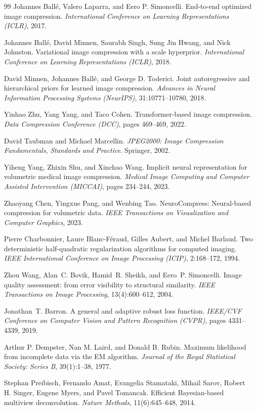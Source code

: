 \documentclass[11pt,a4paper]{article}
\begin{document}
\begin{thebibliography}{99}
Johannes Ball\'e, Valero Laparra, and Eero P. Simoncelli.
End-to-end optimized image compression.
\textit{International Conference on Learning Representations (ICLR)}, 2017.

Johannes Ball\'e, David Minnen, Saurabh Singh, Sung Jin Hwang, and Nick Johnston.
Variational image compression with a scale hyperprior.
\textit{International Conference on Learning Representations (ICLR)}, 2018.

David Minnen, Johannes Ball\'e, and George D. Toderici.
Joint autoregressive and hierarchical priors for learned image compression.
\textit{Advances in Neural Information Processing Systems (NeurIPS)}, 31:10771--10780, 2018.

Yinhao Zhu, Yang Yang, and Taco Cohen.
Transformer-based image compression.
\textit{Data Compression Conference (DCC)}, pages 469--469, 2022.

David Taubman and Michael Marcellin.
\textit{JPEG2000: Image Compression Fundamentals, Standards and Practice}.
Springer, 2002.

Yiheng Yang, Zhixin Shu, and Xinchao Wang.
Implicit neural representation for volumetric medical image compression.
\textit{Medical Image Computing and Computer Assisted Intervention (MICCAI)}, pages 234--244, 2023.

Zhaoyang Chen, Yingxue Pang, and Wenbing Tao.
NeuroCompress: Neural-based compression for volumetric data.
\textit{IEEE Transactions on Visualization and Computer Graphics}, 2023.

Pierre Charbonnier, Laure Blanc-F{\'e}raud, Gilles Aubert, and Michel Barlaud.
Two deterministic half-quadratic regularization algorithms for computed imaging.
\textit{IEEE International Conference on Image Processing (ICIP)}, 2:168--172, 1994.

Zhou Wang, Alan~C. Bovik, Hamid~R. Sheikh, and Eero~P. Simoncelli.
Image quality assessment: from error visibility to structural similarity.
\textit{IEEE Transactions on Image Processing}, 13(4):600--612, 2004.

Jonathan~T. Barron.
A general and adaptive robust loss function.
\textit{IEEE/CVF Conference on Computer Vision and Pattern Recognition (CVPR)}, pages 4331--4339, 2019.

Arthur P. Dempster, Nan M. Laird, and Donald B. Rubin.
Maximum likelihood from incomplete data via the EM algorithm.
\textit{Journal of the Royal Statistical Society: Series B}, 39(1):1--38, 1977.

Stephan Preibisch, Fernando Amat, Evangelia Stamataki, Mihail Sarov, Robert H. Singer, Eugene Myers, and Pavel Tomancak.
Efficient Bayesian-based multiview deconvolution.
\textit{Nature Methods}, 11(6):645--648, 2014.

\end{thebibliography}
\end{document}
